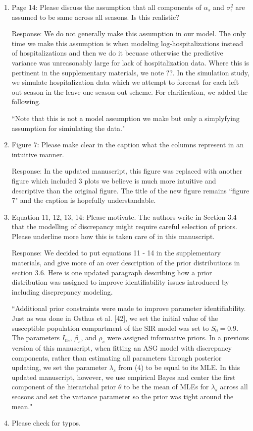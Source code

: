 \documentclass{article}
\newcommand{\spencer}[1]{{\color{red} Response: #1}}
\begin{document}
\begin{enumerate}[-]
\item Page 14: Please discuss the assumption that all components of $\alpha_s$ and 
$\sigma_\epsilon^2$ are assumed to be same across all seasons. Is this realistic?

\spencer{We do not generally make this assumption in our model. The only time
we make this assumption is when modeling log-hospitalizations instead of 
hospitalizations and then we do it becuase otherwise the predictive variance
was unreasonably large for lack of hospitalization data.
Where this is pertinent in the supplementary materials, we note ??.
In the simulation study,
we simulate hospitalization data which we attempt to forecast for each left
out season in the leave one season out scheme. For clarification, we added 
the following.

``Note that this is not
a model assumption we make but only a simplyfying assumption for simiulating
the data."}

\item Figure 7: Please make clear in the caption what the columns represent in an 
intuitive manner. 

\spencer{In the updated manuscript, this figure was replaced with another figure
which included 3 plots we believe is much more intuitive and descriptive than
the original figure. The title of the new figure remains ``figure 7" and 
the caption is hopefully understandable.}

\item Equation 11, 12, 13, 14: Please motivate. The authors write in Section 3.4 
that the modelling of discrepancy might require careful selection of priors. 
Please underline more how this is taken care of in this manuscript.

\spencer{We decided to put equations 11 - 14 in the supplementary materials, and
give more of an over description of the prior distributions in section 3.6. Here
is one updated paragraph describing how a prior distribution was assigned to
improve identifiability issues introduced by including discprepancy modeling.

``Additional prior constraints were made to improve parameter identifiability. 
Just as was done in Osthus et al. [42],
we set the initial value of the 
susceptible population compartment of the SIR model was set to $S_0 = 0.9$. 
The parameters $I_{0s}$, $\beta_s$, and $\rho_s$ were assigned informative 
priors. In a previous version of this manuscript, when fitting an ASG model
with discrepancy components,
rather than estimating all parameters through posterior updating,
we set the parameter $\lambda_s$ from (4)
to be equal to its MLE. In this updated manuscript, 
however, we use empirical Bayes and center the first component of the 
hierarichal prior $\theta$ to be the mean of MLEs for $\lambda_s$ across
all seasons and set the variance parameter so the prior was tight around the
mean."}

\item Please check for typos.
  
\end{enumerate}
\end{document}
